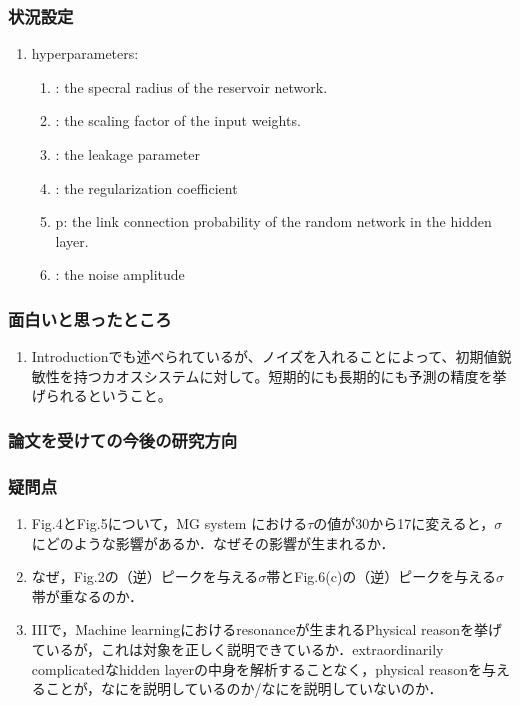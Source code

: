 \subsubsection{状況設定}
\begin{enumerate}
  \item hyperparameters:\begin{enumerate}
    \item \rho: the specral radius of the  reservoir network.
    \item \gamma: the scaling factor of the input weights.
    \item \alpha: the leakage parameter 
    \item \beta: the regularization coefficient 
    \item p: the link connection probability of the random network in the hidden layer.
    \item \sigma: the noise amplitude 
  \end{enumerate}
\end{enumerate}

\subsubsection{面白いと思ったところ}
\begin{enumerate}
  \item Introductionでも述べられているが、ノイズを入れることによって、初期値鋭敏性を持つカオスシステムに対して。短期的にも長期的にも予測の精度を挙げられるということ。
\end{enumerate}

\subsubsection{論文を受けての今後の研究方向}
\subsubsection{疑問点}
\begin{enumerate}
  \item Fig.4とFig.5について，MG system における$\tau$の値が30から17に変えると，$\sigma$にどのような影響があるか．なぜその影響が生まれるか．
  \item なぜ，Fig.2の（逆）ピークを与える$\sigma$帯とFig.6(c)の（逆）ピークを与える$\sigma$帯が重なるのか．
  \item IIIで，Machine learningにおけるresonanceが生まれるPhysical reasonを挙げているが，これは対象を正しく説明できているか．extraordinarily complicatedなhidden layerの中身を解析することなく，physical reasonを与えることが，なにを説明しているのか/なにを説明していないのか．
\end{enumerate}

